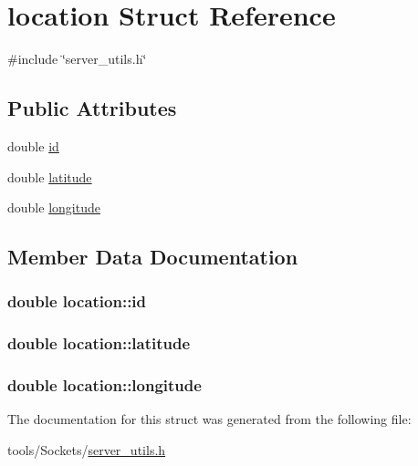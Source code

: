 \hypertarget{structlocation}{\section{location Struct Reference}
\label{structlocation}
}


{\ttfamily \#include \char`\"{}server\-\_\-utils.\-h\char`\"{}}

\subsection*{Public Attributes}
\begin{DoxyCompactItemize}
\item 
double \hyperlink{structlocation_acc43c2957bb0910952e9898fe90032d7}{id}
\item 
double \hyperlink{structlocation_a6e3b75b4fd1788c57eed19f15b19027f}{latitude}
\item 
double \hyperlink{structlocation_a6a03053084fbc68096521ea333e1c7b3}{longitude}
\end{DoxyCompactItemize}


\subsection{Member Data Documentation}
\hypertarget{structlocation_acc43c2957bb0910952e9898fe90032d7}{
\subsubsection[{id}]{\setlength{\rightskip}{0pt plus 5cm}double location\-::id}}\label{structlocation_acc43c2957bb0910952e9898fe90032d7}
\hypertarget{structlocation_a6e3b75b4fd1788c57eed19f15b19027f}{
\subsubsection[{latitude}]{\setlength{\rightskip}{0pt plus 5cm}double location\-::latitude}}\label{structlocation_a6e3b75b4fd1788c57eed19f15b19027f}
\hypertarget{structlocation_a6a03053084fbc68096521ea333e1c7b3}{
\subsubsection[{longitude}]{\setlength{\rightskip}{0pt plus 5cm}double location\-::longitude}}\label{structlocation_a6a03053084fbc68096521ea333e1c7b3}


The documentation for this struct was generated from the following file\-:\begin{DoxyCompactItemize}
\item 
tools/\-Sockets/\hyperlink{server__utils_8h}{server\-\_\-utils.\-h}\end{DoxyCompactItemize}
